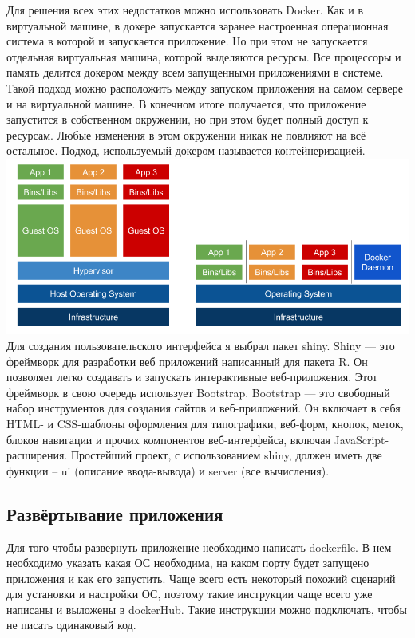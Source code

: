 \documentclass[14pt,a4paper]{scrartcl}
\begin{document}
    Для решения всех этих недостатков можно использовать Docker. Как и в виртуальной машине, в докере запускается заранее настроенная операционная система в которой и запускается приложение. Но при этом не запускается отдельная виртуальная машина, которой выделяются ресурсы. Все процессоры и память делится докером между всем запущенными приложениями в системе. Такой подход можно расположить между запуском приложения на самом сервере и на виртуальной машине. В конечном итоге получается, что приложение запустится в собственном окружении, но при этом будет полный доступ к ресурсам. Любые изменения в этом окружении никак не повлияют на всё остальное. Подход, используемый докером называется контейнеризацией.
    \newline
    \newline
    \includegraphics[width=\textwidth]{Docker-struct.png}
    \newpage
    Для создания пользовательского интерфейса я выбрал пакет shiny. Shiny --- это фреймворк для разработки веб приложений написанный для пакета R. Он позволяет легко создавать и запускать интерактивные веб-приложения. Этот фреймворк в свою очередь использует Bootstrap. Bootstrap — это свободный набор инструментов для создания сайтов и веб-приложений. Он включает в себя HTML- и CSS-шаблоны оформления для типографики, веб-форм, кнопок, меток, блоков навигации и прочих компонентов веб-интерфейса, включая JavaScript-расширения. Простейший проект, с использованием shiny, должен иметь две функции – ui (описание ввода-вывода) и server (все вычисления).

    \subsection[Развёртывание приложения]{Развёртывание приложения}

    Для того чтобы развернуть приложение необходимо написать dockerfile. В нем необходимо указать какая ОС необходима, на каком порту будет запущено приложения и как его запустить. Чаще всего есть некоторый похожий сценарий для установки и настройки ОС, поэтому такие инструкции чаще всего уже написаны и выложены в dockerHub. Такие инструкции можно подключать, чтобы не писать одинаковый код.
\end{document}
